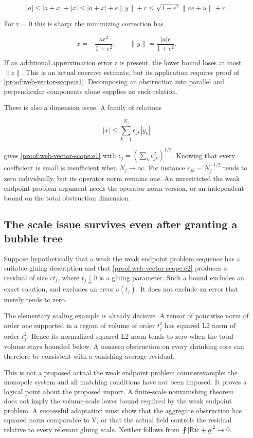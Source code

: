 \[
 |a|\le |a+x|+|x|
 \le |a+x|+\epsilon\|y\|+r
 \le \sqrt{1+\epsilon^2}\|a e+u\|+r.
\]

For r = 0 this is sharp: the minimizing correction has

\[
 x=-\frac{a\epsilon^2}{1+\epsilon^2},
 \qquad \|y\|=\frac{|a|\epsilon}{1+\epsilon^2}.
\]

If an additional approximation error z is present, the lower bound loses at most \(\|z\|\). This is an actual coercive estimate, but its application requires proof of \eqref{proof:web-vector-scope:e1}. Decomposing an obstruction into parallel and perpendicular components alone supplies no such relation.

There is also a dimension issue. A family of relations

\[
 |x|\le\sum_{k=1}^{N_j}\epsilon_{jk}|y_k|
\]

gives \eqref{proof:web-vector-scope:e1} with \(\epsilon_j=(\sum_k\epsilon_{jk}^2)^{1/2}\). Knowing that every coefficient is small is insufficient when \(N_j\to\infty\). For instance \(\epsilon_{jk}=N_j^{-1/2}\) tends to zero individually, but its operator norm remains one. An unrestricted the weak endpoint problem argument needs the operator-norm version, or an independent bound on the total obstruction dimension.

\hypertarget{proof:web-vector-scope:s3}{%
\subsection{The scale issue survives even after granting a bubble tree}\label{proof:web-vector-scope:s3}}

Suppose hypothetically that a weak the weak endpoint problem sequence has a suitable gluing description and that \eqref{proof:web-vector-scope:e2} produces a residual of size \(c t_j\), where \(t_j\downarrow0\) is a gluing parameter. Such a bound excludes an exact solution, and excludes an error \(o(t_j)\). It does not exclude an error that merely tends to zero.

The elementary scaling example is already decisive. A tensor of pointwise norm of order one supported in a region of volume of order \(t_j^2\) has squared L2 norm of order \(t_j^2\). Hence its normalized squared L2 norm tends to zero when the total volume stays bounded below. A nonzero obstruction on every shrinking core can therefore be consistent with a vanishing average residual.

This is not a proposed actual the weak endpoint problem counterexample: the monopole system and all matching conditions have not been imposed. It proves a logical point about the proposed import. A finite-scale nonvanishing theorem does not imply the volume-scale lower bound required by the weak endpoint problem. A successful adaptation must show that the aggregate obstruction has squared norm comparable to V, or that the actual field controls the residual relative to every relevant gluing scale. Neither follows from \(\fint|\mathrm{Ric}+g|^2\to0\).

